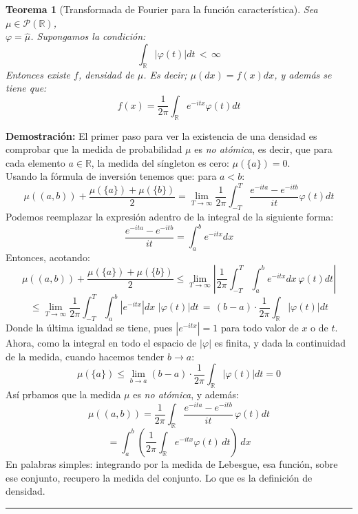 \documentclass[a4paper]{article}
\newtheorem{teorema}{Teorema}
\numberwithin{equation}{subsection}
\def\R{\mathbb R}
\def\to{\rightarrow}
\begin{document}
\begin{teorema}[Transformada de Fourier para la función característica] Sea $\mu\in\mathcal{P}(\R)$, \\$\varphi = \hat{\mu}$. Supongamos la condición:
\[\int_{\R}|\varphi (t)|dt\,<\,\infty\]
Entonces existe $f$, densidad de $\mu$. Es decir; $\mu(dx) = f(x)dx$, y además se tiene que:
\[f(x) = \frac{1}{2\pi}\int_{\R}e^{-itx}\varphi (t) dt\]
\end{teorema}
\textbf{Demostración: }El primer paso para ver la existencia de una densidad es comprobar que la medida de probabilidad $\mu$ es \textit{no atómica}, es decir, que para cada elemento $a\in\R$, la medida del síngleton es cero: $\mu(\{a\})=0$.\\
Usando la fórmula de inversión tenemos que: para $a<b$:
\[\mu((a,b)) + \frac{\mu(\{a\})+\mu(\{b\})}{2} = \lim_{T\to\infty} \frac{1}{2\pi}\int_{-T}^{T}\frac{e^{-ita}-e^{-itb}}{it}\varphi(t)dt\]
Podemos reemplazar la expresión adentro de la integral de la siguiente forma:
\[\frac{e^{-ita}-e^{-itb}}{it} = \int_{a}^{b}e^{-itx}dx\]
Entonces, acotando:
\[\mu((a,b)) + \frac{\mu(\{a\})+\mu(\{b\})}{2} \leq \lim_{T\to\infty} \left|\frac{1}{2\pi}\int_{-T}^{T}\int_{a}^{b}e^{-itx}dx\,\varphi(t)dt\right|\]
\[\leq \lim_{T\to\infty}\frac{1}{2\pi}\int_{-T}^{T}\int_{a}^{b}|e^{-itx}|dx\,\,|\varphi(t)|dt \,=\,(b-a)\cdot \frac{1}{2\pi}\int_{\R}|\varphi(t)|dt\]
Donde la última igualdad se tiene, pues $|e^{-itx}|=1$ para todo valor de $x$ o de $t$. Ahora, como la integral en todo el espacio de $|\varphi|$ es finita, y dada la continuidad de la medida, cuando hacemos tender $b\rightarrow a$:
\[\mu(\{a\}) \leq \lim_{b\to a} (b-a)\cdot \frac{1}{2\pi}\int_{\R}|\varphi(t)|dt = 0\]
Así prbamos que la medida $\mu$ es \textit{no atómica}, y además:
\[\mu((a,b)) = \frac{1}{2\pi}\int_{\R}\frac{e^{-ita}-e^{-itb}}{it}\,\varphi(t)dt\]
\[= \int_{a}^{b}\left(\frac{1}{2\pi}\int_{\R}e^{-itx}\varphi(t)\,dt\right)\,dx\]
En palabras simples: integrando por la medida de Lebesgue, esa función, sobre ese conjunto, recupero la medida del conjunto. Lo que es la definición de densidad.
\rule{0.7em}{0.7em}\\ \newline
\end{document}
